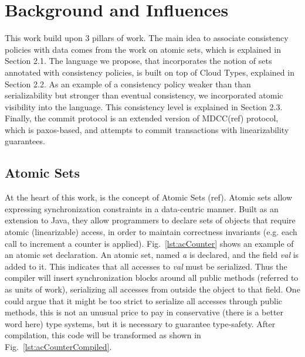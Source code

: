 

\section{Background and Influences}
This work build upon 3 pillars of work. The main idea to associate consistency
policies with data comes from the work on atomic sets, which is explained in
Section 2.1. The language we propose, that incorporates the notion of sets
annotated with consistency policies, is built on top of Cloud Types, explained
in Section 2.2. As an example of a consistency policy weaker than than
serializability but stronger than eventual consistency, we incorporated atomic
visibility into the language. This consistency level is explained in Section
2.3. Finally, the commit protocol is an extended version of MDCC(ref) protocol,
which is paxos-based, and attempts to commit transactions with linearizability
guarantees.



\subsection{Atomic Sets}
At the heart of this work, is the concept of Atomic Sets (ref). Atomic sets allow 
expressing synchronization constraints in a
data-centric manner. Built as an extension to Java, they allow programmers to
declare sets of objects that require atomic (linearizable) access, in order to
maintain correctness invariants (e.g. each call to increment a counter is
applied). Fig.~\ref{lst:acCounter} shows an example of an atomic set
declaration. An atomic set, named \emph{a} is declared, and the field \emph{val}
is added to it. This indicates that all accesses to \emph{val} must be
serialized. Thus the compiler will insert synchronization blocks around all
public methods (referred to as units of work), serializing all accesses from
outside the object to that field. One could argue that it might be too strict to
serialize all accesses through public methods, this is not an unusual price to
pay in conservative (there is a better word here) type systems, but it is
necessary to guarantee type-safety. After compilation, this code will be
transformed as shown in Fig.~\ref{lst:acCounterCompiled}. \\

